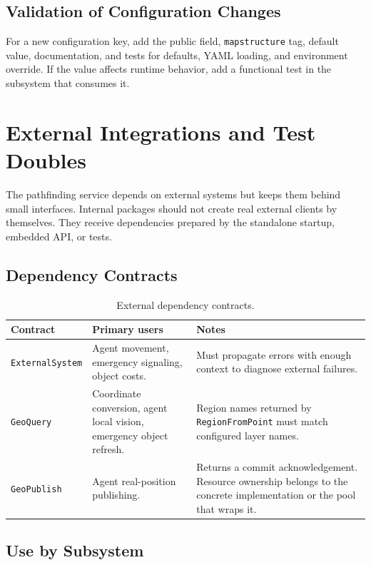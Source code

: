 \documentclass[12pt,a4paper]{report}
\begin{document}
\subsection{Validation of Configuration Changes}

For a new configuration key, add the public field, \texttt{mapstructure} tag,
default value, documentation, and tests for defaults, YAML loading, and
environment override. If the value affects runtime behavior, add a functional
test in the subsystem that consumes it.

\section{External Integrations and Test Doubles}

The pathfinding service depends on external systems but keeps them behind small
interfaces. Internal packages should not create real external clients by
themselves. They receive dependencies prepared by the standalone startup,
embedded API, or tests.

\subsection{Dependency Contracts}

\begin{table}[H]
\centering
\begin{tabular}{|p{}|p{}|p{}|}
\hline
\textbf{Contract} & \textbf{Primary users} & \textbf{Notes} \\
\hline
\texttt{ExternalSystem} &
Agent movement, emergency signaling, object costs. &
Must propagate errors with enough context to diagnose external failures. \\
\hline
\texttt{GeoQuery} &
Coordinate conversion, agent local vision, emergency object refresh. &
Region names returned by \texttt{RegionFromPoint} must match configured layer
names. \\
\hline
\texttt{GeoPublish} &
Agent real-position publishing. &
Returns a commit acknowledgement. Resource ownership belongs to the concrete
implementation or the pool that wraps it. \\
\hline
\end{tabular}
\caption{External dependency contracts.}
\end{table}

\subsection{Use by Subsystem}
\end{document}
